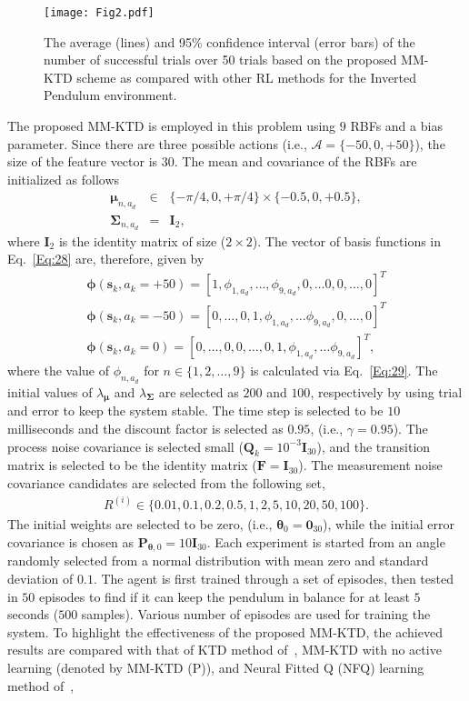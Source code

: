 \documentclass{ieeeaccess}
\def\mA{\mathcal{A}}
\def\MMK{\text{MM-KTD}}
\def\k{_{k}}
\def\i{^{i}}
\def\bt{\bm{\theta}}
\def\I{\bm{I}}
\def\Q{\bm{Q}}
\def\P{\bm{P}}
\def\F{\bm{F}}
\def\u{\bm{\mu}}
\def\Sig{\bm{\Sigma}}
\def\s{\bm{s}}
\def\i{^{(i)}}
\begin{document}
\begin{figure}[t!]
\centering
\texttt{[image: Fig2.pdf]}
\caption{\small The average (lines) and 95\% confidence interval (error bars) of the number of successful trials over 50 trials based on the proposed MM-KTD scheme as compared with other RL methods for the Inverted Pendulum environment.}\label{Fig:2}
\end{figure}
The proposed $\MMK$ is employed in this problem using $9$ RBFs and a bias parameter. Since there are three possible actions (i.e., $\mA =\{-50, 0, +50 \}$), the size of the feature vector is $30$. The mean and covariance of the RBFs are initialized as follows
%
\begin{eqnarray}
\u_{n,a_d} &\in& \{-\pi/4, 0, +\pi/4 \}\times \{-0.5, 0, +0.5\},\label{Eq:mean}\\
\Sig_{n,a_d} &=& \I_2,
\end{eqnarray}
%
where $\I_2$ is the identity matrix of size ($2\times 2$). The vector of basis functions in Eq.~\eqref{Eq:28} are, therefore, given by
%
\begin{eqnarray}
\bm{\phi}(\s\k,a\k=+50)\!=\! [1,\phi_{1,a_d},\ldots ,\phi_{9,a_d}, 0, \ldots 0,0,\ldots, 0]^T \\
\bm{\phi}(\s\k,a\k=-50)\! = \! [0, \ldots ,0,1,\phi_{1,a_d},\ldots \phi_{9,a_d},0, \ldots ,0 ]^T\\
\bm{\phi}(\s\k,a\k=0)\!=\![0, \ldots ,0,0, \ldots ,0,1,\phi_{1,a_d},\ldots \phi_{9,a_d}]^T,
\end{eqnarray}
%
where the value of $\phi_{n,a_d}$ for $n \in \{1,2,\dots,9\}$ is calculated via Eq.~\eqref{Eq:29}.
The initial values of $\lambda_{\u}$ and $\lambda_{\Sig}$ are selected as $200$ and $100$, respectively by using trial and error to keep the system stable. The time step is selected to be $10$ milliseconds and the discount factor is selected as $0.95$, (i.e.,  $\gamma = 0.95$). The process noise covariance is selected small ($\Q\k = 10^{-3}\I_{30}$), and the transition matrix is selected to be the identity matrix ($\F = \I_{30}$). The measurement noise covariance candidates are selected from the following set,
%
\begin{eqnarray}
R\i \in \{0.01,0.1, 0.2, 0.5, 1, 2, 5, 10, 20, 50, 100\}.
\end{eqnarray}
%
The initial weights are selected to be zero, (i.e., $\bt_0 = \bm{0}_{30}$), while the initial error covariance is chosen as $\P_{\bt,0} = 10\I_{30}$. Each experiment is started from an angle randomly selected from a normal distribution with mean zero and standard deviation of $0.1$. The agent is first trained through a set of episodes, then tested in $50$ episodes to find if it can keep the pendulum in balance for at least $5$ seconds ($500$ samples). Various number of episodes are used for training the system. To highlight the effectiveness of the proposed $\MMK$, the achieved results are compared with that of KTD method of~\cite{23}, $\MMK$ with no active learning (denoted by $\MMK$ (P)), and Neural Fitted Q (NFQ) learning method of~\cite{6}, 
\end{document}
